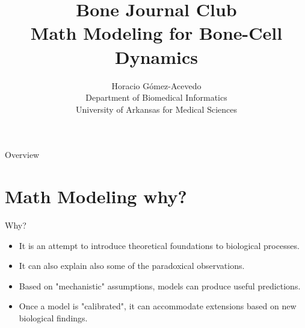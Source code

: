 \documentclass{beamer}
\title{Bone Journal Club\\ Math Modeling for Bone-Cell Dynamics}
\author{Horacio G\'omez-Acevedo\\ Department of Biomedical Informatics\\
	University of Arkansas for Medical Sciences}
\begin{document}
	\begin{frame}[plain]
		\maketitle
	\end{frame}

\begin{frame}{Overview}
	\tableofcontents
\end{frame}

\section{Math Modeling why?}
\begin{frame}{Why?}

\begin{itemize}
	\item It is an attempt to introduce theoretical foundations to biological processes.
	\item It can also explain also some of the paradoxical observations.
	\item Based on "mechanistic" assumptions, models can produce useful predictions. 
	\item Once a model is "calibrated", it can accommodate extensions based on new biological findings. 
\end{itemize}	


\end{frame}
\end{document}
